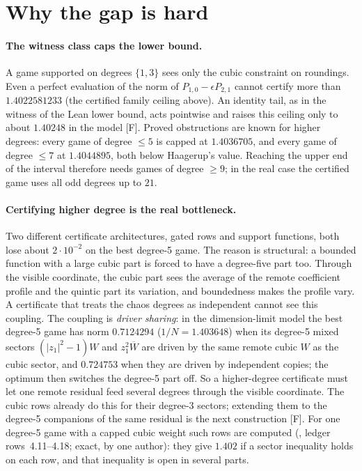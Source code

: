 \documentclass[11pt,a4paper]{article}
\begin{document}
\section{Why the gap is hard}
\paragraph{The witness class caps the lower bound.} A game supported on degrees $\{1,3\}$ sees only the cubic constraint on
roundings. Even a perfect evaluation of the norm of $P_{1,0}-\epsilon P_{2,1}$ cannot certify more than $1.4022581233$
(the certified family ceiling above). An identity tail, as in the witness of the Lean lower bound, acts pointwise and
raises this ceiling only to about $1.40248$ in the model [F]. Proved obstructions are known for higher degrees: every
game of degree $\le5$ is capped at $1.4036705$, and every game of degree $\le7$ at $1.4044895$, both below Haagerup's
value. Reaching the upper
end of the interval therefore needs games of degree $\ge9$; in the real case the certified game uses all odd degrees up to
$21$.

\paragraph{Certifying higher degree is the real bottleneck.} Two different certificate architectures, gated rows and
support functions, both lose about $2\cdot10^{-2}$ on the best degree-5 game. The reason is structural: a bounded function
with a large cubic part is forced to have a degree-five part too. Through the visible coordinate, the cubic part sees the
average of the remote coefficient profile and the quintic part its variation, and boundedness makes the profile vary. A
certificate that treats the chaos degrees as independent cannot see this coupling.
The coupling is \emph{driver sharing}: in the dimension-limit model the best degree-5 game has norm $0.7124294$
($1/N=1.403648$) when its degree-5 mixed sectors $(|z_1|^2-1)W$ and $z_1^2\overline W$ are driven by the same remote cubic $W$ as
the cubic sector, and $0.724753$ when they are driven by independent copies; the optimum then switches the degree-5 part off.
So a higher-degree certificate must let one remote residual feed several degrees through the visible coordinate. The cubic
rows already do this for their degree-3 sectors; extending them to the degree-5 companions of the same residual is the
next construction [F]. For one degree-5 game with a capped cubic weight such rows are computed
(, ledger rows~4.11--4.18; exact, by one author): they give $1.402$ if a sector inequality
holds on each row, and that inequality is open in several parts.
\end{document}
